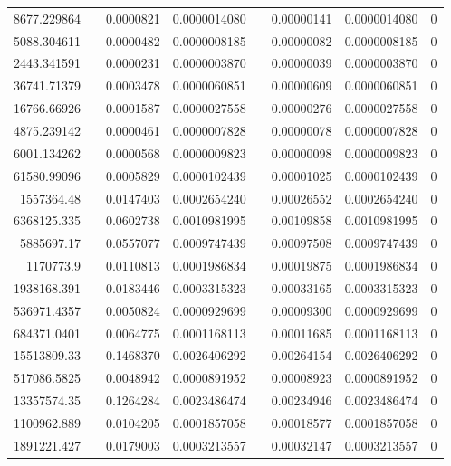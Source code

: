 \documentclass[
journal=jacsat, %
manuscript=article]{achemso}
\begin{document}
\begin{table}[htbp]
{\begin{tabular}{rrrrrrrr}
    8677.229864 &       & 0.0000821 & 0.0000014080 &       & 0.00000141 & 0.0000014080 & 0 \\
    5088.304611 &       & 0.0000482 & 0.0000008185 &       & 0.00000082 & 0.0000008185 & 0 \\
    2443.341591 &       & 0.0000231 & 0.0000003870 &       & 0.00000039 & 0.0000003870 & 0 \\
    36741.71379 &       & 0.0003478 & 0.0000060851 &       & 0.00000609 & 0.0000060851 & 0 \\
    16766.66926 &       & 0.0001587 & 0.0000027558 &       & 0.00000276 & 0.0000027558 & 0 \\
    4875.239142 &       & 0.0000461 & 0.0000007828 &       & 0.00000078 & 0.0000007828 & 0 \\
    6001.134262 &       & 0.0000568 & 0.0000009823 &       & 0.00000098 & 0.0000009823 & 0 \\
    61580.99096 &       & 0.0005829 & 0.0000102439 &       & 0.00001025 & 0.0000102439 & 0 \\
    1557364.48 &       & 0.0147403 & 0.0002654240 &       & 0.00026552 & 0.0002654240 & 0 \\
    6368125.335 &       & 0.0602738 & 0.0010981995 &       & 0.00109858 & 0.0010981995 & 0 \\
    5885697.17 &       & 0.0557077 & 0.0009747439 &       & 0.00097508 & 0.0009747439 & 0 \\
    1170773.9 &       & 0.0110813 & 0.0001986834 &       & 0.00019875 & 0.0001986834 & 0 \\
    1938168.391 &       & 0.0183446 & 0.0003315323 &       & 0.00033165 & 0.0003315323 & 0 \\
    536971.4357 &       & 0.0050824 & 0.0000929699 &       & 0.00009300 & 0.0000929699 & 0 \\
    684371.0401 &       & 0.0064775 & 0.0001168113 &       & 0.00011685 & 0.0001168113 & 0 \\
    15513809.33 &       & 0.1468370 & 0.0026406292 &       & 0.00264154 & 0.0026406292 & 0 \\
    517086.5825 &       & 0.0048942 & 0.0000891952 &       & 0.00008923 & 0.0000891952 & 0 \\
    13357574.35 &       & 0.1264284 & 0.0023486474 &       & 0.00234946 & 0.0023486474 & 0 \\
    1100962.889 &       & 0.0104205 & 0.0001857058 &       & 0.00018577 & 0.0001857058 & 0 \\
    1891221.427 &       & 0.0179003 & 0.0003213557 &       & 0.00032147 & 0.0003213557 & 0 \\

\end{tabular}}
\end{table}
\end{document}
